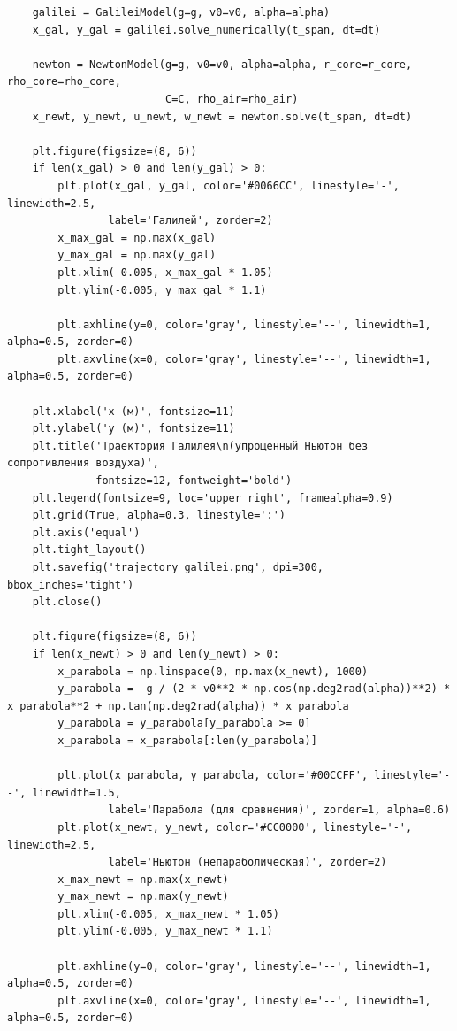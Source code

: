 \documentclass[a4paper, 14pt]{extarticle}
\begin{document}
\begin{longlisting}
\begin{verbatim}
    galilei = GalileiModel(g=g, v0=v0, alpha=alpha)
    x_gal, y_gal = galilei.solve_numerically(t_span, dt=dt)
    
    newton = NewtonModel(g=g, v0=v0, alpha=alpha, r_core=r_core, rho_core=rho_core, 
                         C=C, rho_air=rho_air)
    x_newt, y_newt, u_newt, w_newt = newton.solve(t_span, dt=dt)
    
    plt.figure(figsize=(8, 6))
    if len(x_gal) > 0 and len(y_gal) > 0:
        plt.plot(x_gal, y_gal, color='#0066CC', linestyle='-', linewidth=2.5, 
                label='Галилей', zorder=2)
        x_max_gal = np.max(x_gal)
        y_max_gal = np.max(y_gal)
        plt.xlim(-0.005, x_max_gal * 1.05)
        plt.ylim(-0.005, y_max_gal * 1.1)
        
        plt.axhline(y=0, color='gray', linestyle='--', linewidth=1, alpha=0.5, zorder=0)
        plt.axvline(x=0, color='gray', linestyle='--', linewidth=1, alpha=0.5, zorder=0)
    
    plt.xlabel('x (м)', fontsize=11)
    plt.ylabel('y (м)', fontsize=11)
    plt.title('Траектория Галилея\n(упрощенный Ньютон без сопротивления воздуха)', 
              fontsize=12, fontweight='bold')
    plt.legend(fontsize=9, loc='upper right', framealpha=0.9)
    plt.grid(True, alpha=0.3, linestyle=':')
    plt.axis('equal')
    plt.tight_layout()
    plt.savefig('trajectory_galilei.png', dpi=300, bbox_inches='tight')
    plt.close()
    
    plt.figure(figsize=(8, 6))
    if len(x_newt) > 0 and len(y_newt) > 0:
        x_parabola = np.linspace(0, np.max(x_newt), 1000)
        y_parabola = -g / (2 * v0**2 * np.cos(np.deg2rad(alpha))**2) * x_parabola**2 + np.tan(np.deg2rad(alpha)) * x_parabola
        y_parabola = y_parabola[y_parabola >= 0]
        x_parabola = x_parabola[:len(y_parabola)]
        
        plt.plot(x_parabola, y_parabola, color='#00CCFF', linestyle='--', linewidth=1.5, 
                label='Парабола (для сравнения)', zorder=1, alpha=0.6)
        plt.plot(x_newt, y_newt, color='#CC0000', linestyle='-', linewidth=2.5, 
                label='Ньютон (непараболическая)', zorder=2)
        x_max_newt = np.max(x_newt)
        y_max_newt = np.max(y_newt)
        plt.xlim(-0.005, x_max_newt * 1.05)
        plt.ylim(-0.005, y_max_newt * 1.1)
        
        plt.axhline(y=0, color='gray', linestyle='--', linewidth=1, alpha=0.5, zorder=0)
        plt.axvline(x=0, color='gray', linestyle='--', linewidth=1, alpha=0.5, zorder=0)
    

\end{verbatim}
\end{longlisting}
\end{document}
